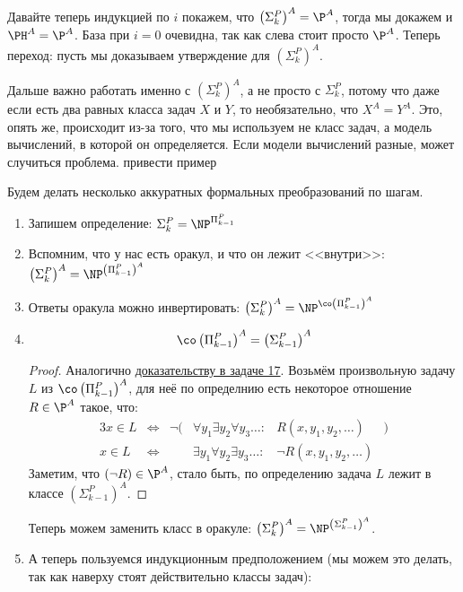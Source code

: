 	Давайте теперь индукцией по $i$ покажем, что $\left(\Sigma_k^P\right)^A = \P^A$, тогда мы докажем и $\PH^A=\P^A$.
	База при $i=0$ очевидна, так как слева стоит просто $\P^A$.
	Теперь переход: пусть мы доказываем утверждение для $\left(\Sigma_k^P\right)^A$.
	\begin{Rem}
		Дальше важно работать именно с $\left(\Sigma_k^P\right)^A$, а не просто с $\Sigma_k^P$, потому что
		даже если есть два равных класса задач $X$ и $Y$, то необязательно, что $X^A=Y^A$.
		Это, опять же, происходит из-за того, что мы используем не класс задач, а модель вычислений, в которой он определяется.
		Если модели вычислений разные, может случиться проблема.
		\TODO привести пример
	\end{Rem}
	Будем делать несколько аккуратных формальных преобразований по шагам.
	\begin{enumerate}
		\item
			Запишем определение: $\Sigma_k^P = \NP^{\Pi_{k-1}^P}$
		\item
			Вспомним, что у нас есть оракул, и что он лежит <<внутри>>: $\left(\Sigma_k^P\right)^A = \NP^{\left(\Pi_{k-1}^P\right)^A}$
		\item
			Ответы оракула можно инвертировать: $\left(\Sigma_k^P\right)^A = \NP^{\co\left(\Pi_{k-1}^P\right)^A}$
		\item
			\begin{lemma}
				\[ \co\left(\Pi_{k-1}^P\right)^A = \left(\Sigma_{k-1}^P\right)^A \]
			\end{lemma}
			\begin{proof}
				Аналогично \hyperref[prob17_quantors]{доказательству в задаче 17}.
				Возьмём произвольную задачу $L$ из $\co\left(\Pi_{k-1}^P\right)^A$, для неё по определнию есть некоторое отношение $R \in \P^A$ такое, что:
				\begin{alignat*}{3}
					x \in L &\iff& \lnot(&\forall y_1 \exists y_2 \forall y_3 \dots \colon &      R(x, y_1, y_2, \dots)&) \\
					x \in L &\iff&       &\exists y_1 \forall y_2 \exists y_3 \dots \colon &\lnot R(x, y_1, y_2, \dots)&
				\end{alignat*}
				Заметим, что $(\lnot R) \in \P^A$, стало быть, по определению задача $L$ лежит в классе $\left(\Sigma_{k-1}^P\right)^A$.
			\end{proof}
			Теперь можем заменить класс в оракуле: $\left(\Sigma_k^P\right)^A = \NP^{\left(\Sigma_{k-1}^P\right)^A}$.
		\item
			А теперь пользуемся индукционным предположением (мы можем это делать, так как наверху стоят действительно классы задач):

\end{enumerate}
